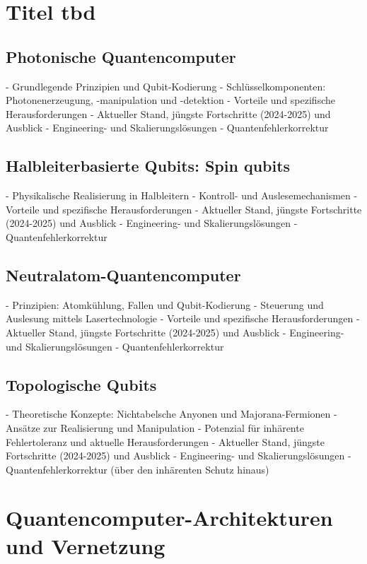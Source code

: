 \section{Titel tbd}
\subsection{Photonische Quantencomputer}
    - Grundlegende Prinzipien und Qubit-Kodierung
    - Schlüsselkomponenten: Photonenerzeugung, -manipulation und -detektion
    - Vorteile und spezifische Herausforderungen
    - Aktueller Stand, jüngste Fortschritte (2024-2025) und Ausblick
    - Engineering- und Skalierungslösungen
    - Quantenfehlerkorrektur

\subsection{Halbleiterbasierte Qubits: Spin qubits}
    - Physikalische Realisierung in Halbleitern
    - Kontroll- und Auslesemechanismen
    - Vorteile und spezifische Herausforderungen
    - Aktueller Stand, jüngste Fortschritte (2024-2025) und Ausblick
    - Engineering- und Skalierungslösungen
    - Quantenfehlerkorrektur

\subsection{Neutralatom-Quantencomputer}
    - Prinzipien: Atomkühlung, Fallen und Qubit-Kodierung
    - Steuerung und Auslesung mittels Lasertechnologie
    - Vorteile und spezifische Herausforderungen
    - Aktueller Stand, jüngste Fortschritte (2024-2025) und Ausblick
    - Engineering- und Skalierungslösungen
    - Quantenfehlerkorrektur

\subsection{Topologische Qubits}
    - Theoretische Konzepte: Nichtabelsche Anyonen und Majorana-Fermionen
    - Ansätze zur Realisierung und Manipulation
    - Potenzial für inhärente Fehlertoleranz und aktuelle Herausforderungen
    - Aktueller Stand, jüngste Fortschritte (2024-2025) und Ausblick
    - Engineering- und Skalierungslösungen
    - Quantenfehlerkorrektur (über den inhärenten Schutz hinaus)



\section{Quantencomputer-Architekturen und Vernetzung}
